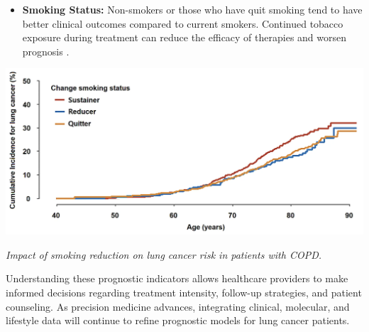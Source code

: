 \begin{itemize}
    \item \textbf{Smoking Status:} Non-smokers or those who have quit smoking tend to have better 
    clinical outcomes compared to current smokers. Continued tobacco exposure during treatment can 
    reduce the efficacy of therapies and worsen prognosis \cite{gilbert2020smoking}.
\end{itemize}

\vspace{1em}
\begin{center}
    \includegraphics[width=1.00\textwidth]{../assets/05-prognosis/smoking-clinical-outcomes.png}

    \small\textit{Impact of smoking reduction on lung cancer risk in patients with COPD. 
    \cite{shin2024impact}}
\end{center}
\vspace{1em}

Understanding these prognostic indicators allows healthcare providers to make informed decisions 
regarding treatment intensity, follow-up strategies, and patient counseling. As precision medicine 
advances, integrating clinical, molecular, and lifestyle data will continue to refine prognostic 
models for lung cancer patients.

